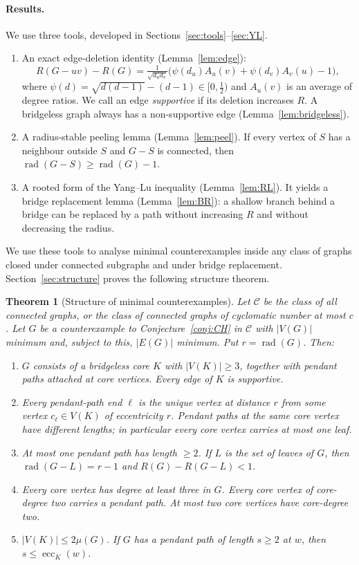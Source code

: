 \documentclass[11pt,a4paper]{article}
\newtheorem{theorem}{Theorem}[section]
\theoremstyle{definition}
\newcommand{\rad}{\operatorname{rad}}
\newcommand{\ecc}{\operatorname{ecc}}
\newcommand{\C}{\mathcal{C}}
\begin{document}
\paragraph{Results.}
We use three tools, developed in Sections~\ref{sec:tools}--\ref{sec:YL}.
\begin{enumerate}[label=(\Alph*)]
\item An exact edge-deletion identity (Lemma~\ref{lem:edge}):
\[
R(G-uv)-R(G)=\tfrac{1}{\sqrt{d_ud_v}}\bigl(\psi(d_u)A_u(v)+\psi(d_v)A_v(u)-1\bigr),
\]
where $\psi(d)=\sqrt{d(d-1)}-(d-1)\in[0,\frac12)$ and $A_u(v)$ is an average of degree ratios. We call an edge \emph{supportive} if its deletion increases $R$. A bridgeless graph always has a non-supportive edge (Lemma~\ref{lem:bridgeless}).
\item A radius-stable peeling lemma (Lemma~\ref{lem:peel}). If every vertex of $S$ has a neighbour outside $S$ and $G-S$ is connected, then $\rad(G-S)\ge\rad(G)-1$.
\item A rooted form of the Yang--Lu inequality (Lemma~\ref{lem:RL}). It yields a bridge replacement lemma (Lemma~\ref{lem:BR}): a shallow branch behind a bridge can be replaced by a path without increasing $R$ and without decreasing the radius.
\end{enumerate}

We use these tools to analyse minimal counterexamples inside any class of graphs closed under connected subgraphs and under bridge replacement. Section~\ref{sec:structure} proves the following structure theorem.

\begin{theorem}[Structure of minimal counterexamples]\label{thm:structure}
Let $\C$ be the class of all connected graphs, or the class of connected graphs of cyclomatic number at most $c$. Let $G$ be a counterexample to Conjecture~\ref{conj:CH} in $\C$ with $|V(G)|$ minimum and, subject to this, $|E(G)|$ minimum. Put $r=\rad(G)$. Then:
\begin{enumerate}[label=\textup{(\roman*)}]
\item $G$ consists of a bridgeless \emph{core} $K$ with $|V(K)|\ge 3$, together with pendant paths attached at core vertices. Every edge of $K$ is supportive.
\item Every pendant-path end $\ell$ is the unique vertex at distance $r$ from some vertex $c_\ell\in V(K)$ of eccentricity $r$. Pendant paths at the same core vertex have different lengths; in particular every core vertex carries at most one leaf.
\item At most one pendant path has length $\ge2$. If $L$ is the set of leaves of $G$, then $\rad(G-L)=r-1$ and $R(G)-R(G-L)<1$.
\item Every core vertex has degree at least three in $G$. Every core vertex of core-degree two carries a pendant path. At most two core vertices have core-degree two.
\item $|V(K)|\le 2\mu(G)$. If $G$ has a pendant path of length $s\ge2$ at $w$, then $s\le\ecc_K(w)$.
\end{enumerate}
\end{theorem}
\end{document}

